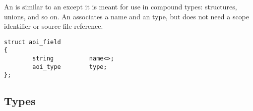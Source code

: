 An  is similar to an  except it is meant for use in
compound types: structures, unions, and so on.  An  associates a
name and an type, but does not need a scope identifier or source file
reference.

\begin{verbatim}
struct aoi_field
{
        string          name<>;
        aoi_type        type;
};
\end{verbatim}



\subsection{Types}
\label{subsec:AOI:Types}

